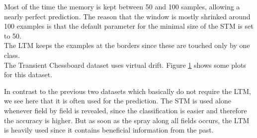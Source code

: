 \documentclass[conference]{IEEEtran}
\begin{document}
Most of the time the memory is kept between 50 and 100 samples, allowing a nearly perfect prediction. 
The reason that the window is mostly shrinked around 100 examples is that the default parameter for the minimal size of the STM is set to 50.\\
The LTM keeps the examples at the borders since these are touched only by one class.\\
The Transient Chessboard dataset uses virtual drift. Figure \ref{fig:chess} shows some plots for this dataset.
\begin{figure}
\centering
	\vspace{0 pt}
\label{fig:chess}
\caption{}
\end{figure}
In contrast to the previous two datasets which basically do not require the LTM, we see here that it 
is often used for the prediction. The STM is used alone whenever
field by field is revealed, since the classification is easier and therefore the accuracy is higher. But as soon as the spray along all fields occurs, the LTM
is heavily used since it contains beneficial information from the past. 
\end{document}
